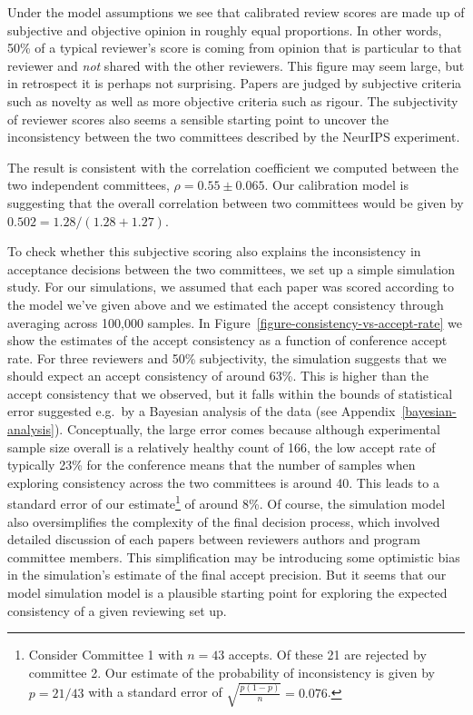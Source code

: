 \documentclass[twoside]{article}
\begin{document}
Under the model assumptions we see that calibrated review scores are
made up of subjective and objective opinion in roughly equal
proportions. In other words, 50\% of a typical reviewer's score is
coming from opinion that is particular to that reviewer and \emph{not}
shared with the other reviewers. This figure may seem large, but in
retrospect it is perhaps not surprising. Papers are judged by
subjective criteria such as novelty as well as more objective criteria
such as rigour. The subjectivity of reviewer scores also seems a
sensible starting point to  uncover the inconsistency between the two
committees described by the NeurIPS experiment. 

The result is consistent with the correlation coefficient we computed
between the two independent committees, $\rho = 0.55 \pm 0.065$. Our
calibration model is suggesting that the overall correlation between
two committees would be given by $0.502 = 1.28/(1.28+1.27)$.

To check whether this subjective scoring also explains the
inconsistency in acceptance decisions between the two committees, we set up a
simple simulation study. For our simulations, we assumed that each
paper was scored according to the model we've given above and we
estimated the accept consistency through averaging across 100,000
samples. In Figure~\ref{figure-consistency-vs-accept-rate} we show the
estimates of the accept consistency as a function of conference accept
rate. For three reviewers and 50\% subjectivity, the simulation
suggests that we should expect an accept consistency of around
63\%. This is higher than the accept consistency that we observed, but
it falls within the bounds of statistical error suggested e.g.\ by a
Bayesian analysis of the data (see Appendix~\ref{bayesian-analysis}). Conceptually, the large error comes because
although experimental sample size overall is a relatively healthy count of 166,
the low accept rate of typically 23\% for the conference means that the number of
samples when exploring consistency across the two committees is around
40. This leads to a standard error of our
estimate\footnote{Consider Committee 1 with $n=43$ accepts. Of these
  21 are rejected by committee 2. Our estimate of the probability of
  inconsistency is given by $p=21/43$ with a standard error of
  $\sqrt{\frac{p(1-p)}{n}} = 0.076$.} of around 8\%.  Of course, the
simulation model also oversimplifies the complexity of the final
decision process, which involved detailed discussion of each papers
between reviewers authors and program committee members. This
simplification may be introducing some optimistic bias in the
simulation's estimate of the final accept precision. But it seems that
our model simulation model is a plausible starting point for exploring
the expected consistency of a given reviewing set up.
\end{document}
